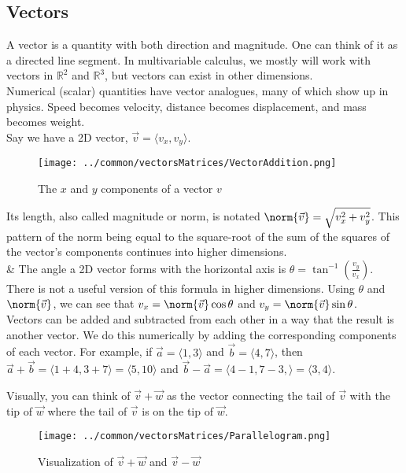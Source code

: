 \subsection{Vectors}
\noindent
A vector is a quantity with both direction and magnitude.
One can think of it as a directed line segment.
In multivariable calculus, we mostly will work with vectors in $\mathbb{R}^2$ and $\mathbb{R}^3$, but vectors can exist in other dimensions.\\

\noindent
Numerical (scalar) quantities have vector analogues, many of which show up in physics.
Speed becomes velocity, distance becomes displacement, and mass becomes weight.\\

\noindent
Say we have a 2D vector, $\vec{v} = \langle v_x, v_y \rangle$.

\begin{figure}[H]
	\centering
	\texttt{[image: ../common/vectorsMatrices/VectorAddition.png]}
	\caption{The $x$ and $y$ components of a vector $v$}
\end{figure}

\noindent
Its length, also called magnitude or norm, is notated $\norm{\vec{v}} = \sqrt{v_x^2+v_y^2}$.
This pattern of the norm being equal to the square-root of the sum of the squares of the vector's components continues into higher dimensions.\\
\&
\noindent
The angle a 2D vector forms with the horizontal axis is $\theta = \tan^{-1}{\left(\frac{v_y}{v_x}\right)}$.
There is not a useful version of this formula in higher dimensions.
Using $\theta$ and $\norm{\vec{v}}$, we can see that $v_x = \norm{\vec{v}}\cos{\theta}$ and $v_y = \norm{\vec{v}}\sin{\theta}$.\\

\noindent
Vectors can be added and subtracted from each other in a way that the result is another vector.
We do this numerically by adding the corresponding components of each vector.
For example, if $\vec{a} = \langle 1,3 \rangle$ and $\vec{b} = \langle 4,7 \rangle$, then $\vec{a}+\vec{b} = \langle 1+4, 3+7 \rangle = \langle 5,10 \rangle$
and $\vec{b}-\vec{a} = \langle 4-1, 7-3, \rangle = \langle 3,4 \rangle$.

\noindent
Visually, you can think of $\vec{v}+\vec{w}$ as the vector connecting the tail of $\vec{v}$ with the tip of $\vec{w}$ where the tail of $\vec{v}$ is on the tip of $\vec{w}$.

\begin{figure}[H]
	\centering
	\texttt{[image: ../common/vectorsMatrices/Parallelogram.png]}
	\caption{Visualization of $\vec{v}+\vec{w}$ and $\vec{v} - \vec{w}$}
\end{figure}

